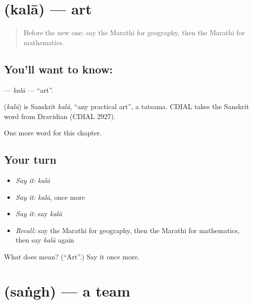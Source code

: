 \section[\texorpdfstring{\mr{कला} (kalā)}{कला (kalā)}]{ (kalā) — art}

\label{lesson:MR-C250-kala}



\begin{quote}
Before the new one: say the Marathi for geography, then the Marathi for mathematics.
\end{quote}

\subsection*{You'll want to know: }
\textbf{} — \emph{kalā} — \textquotedblleft{}art\textquotedblright{}.

\begin{cousinweb}
\textbf{} (\emph{kalā}) is Sanskrit \emph{kalā}, \textquotedblleft{}any practical art\textquotedblright{}, a tatsama. CDIAL takes the Sanskrit word from Dravidian (CDIAL 2927).
\end{cousinweb}

\begin{grammarlens}[title={What you've built}]
One more word for this chapter.
\end{grammarlens}

\subsection*{Your turn}
\begin{itemize}
\raggedright
  \item \emph{Say it:} \emph{kalā}
  \item \emph{Say it:} \emph{kalā}, once more
  \item \emph{Say it:} say \emph{kalā}
  \item \emph{Recall:} say the Marathi for geography, then the Marathi for mathematics, then say \emph{kalā} again
\end{itemize}

\begin{tcolorbox}[breakable,colback=teal!4,colframe=teal!35!black,title={Before you move on}]
What does  mean? (\textquotedblleft{}Art\textquotedblright{}.) Say it once more.
\end{tcolorbox}
\section[\texorpdfstring{\mr{संघ} (saṅgh)}{संघ (saṅgh)}]{ (saṅgh) — a team}

